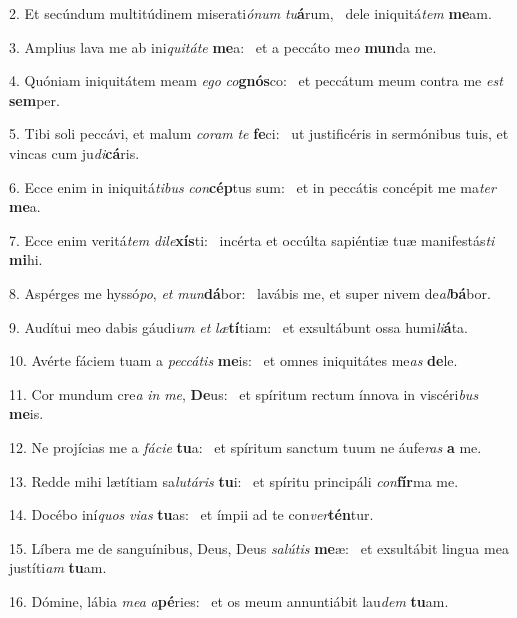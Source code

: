 2. Et secúndum multitúdinem miserati\textit{ó}\textit{num} \textit{tu}\textbf{á}rum, \ast\  dele iniquitá\textit{tem} \textbf{me}am.\

3. Amplius lava me ab ini\textit{qui}\textit{tá}\textit{te} \textbf{me}a: \ast\  et a peccáto me\textit{o} \textbf{mun}da me.\

4. Quóniam iniquitátem meam \textit{e}\textit{go} \textit{co}\textbf{gnós}co: \ast\  et peccátum meum contra me \textit{est} \textbf{sem}per.\

5. Tibi soli peccávi, et malum \textit{co}\textit{ram} \textit{te} \textbf{fe}ci: \ast\  ut justificéris in sermónibus tuis, et vincas cum ju\textit{di}\textbf{cá}ris.\

6. Ecce enim in iniquitá\textit{ti}\textit{bus} \textit{con}\textbf{cép}tus sum: \ast\  et in peccátis concépit me ma\textit{ter} \textbf{me}a.\

7. Ecce enim veritá\textit{tem} \textit{di}\textit{le}\textbf{xís}ti: \ast\  incérta et occúlta sapiéntiæ tuæ manifestás\textit{ti} \textbf{mi}hi.\

8. Aspérges me hyssó\textit{po}, \textit{et} \textit{mun}\textbf{dá}bor: \ast\  lavábis me, et super nivem de\textit{al}\textbf{bá}bor.\

9. Audítui meo dabis gáudi\textit{um} \textit{et} \textit{læ}\textbf{tí}tiam: \ast\  et exsultábunt ossa humi\textit{li}\textbf{á}ta.\

10. Avérte fáciem tuam a \textit{pec}\textit{cá}\textit{tis} \textbf{me}is: \ast\  et omnes iniquitátes me\textit{as} \textbf{de}le.\

11. Cor mundum cre\textit{a} \textit{in} \textit{me}, \textbf{De}us: \ast\  et spíritum rectum ínnova in viscéri\textit{bus} \textbf{me}is.\

12. Ne projícias me a \textit{fá}\textit{ci}\textit{e} \textbf{tu}a: \ast\  et spíritum sanctum tuum ne áufe\textit{ras} \textbf{a} me.\

13. Redde mihi lætítiam sa\textit{lu}\textit{tá}\textit{ris} \textbf{tu}i: \ast\  et spíritu principáli \textit{con}\textbf{fír}ma me.\

14. Docébo iní\textit{quos} \textit{vi}\textit{as} \textbf{tu}as: \ast\  et ímpii ad te con\textit{ver}\textbf{tén}tur.\

15. Líbera me de sanguínibus, Deus, Deus \textit{sa}\textit{lú}\textit{tis} \textbf{me}æ: \ast\  et exsultábit lingua mea justíti\textit{am} \textbf{tu}am.\

16. Dómine, lábia \textit{me}\textit{a} \textit{a}\textbf{pé}ries: \ast\  et os meum annuntiábit lau\textit{dem} \textbf{tu}am.\

